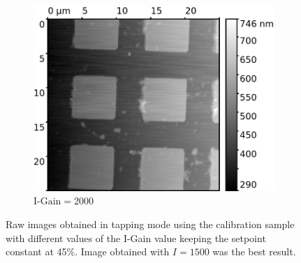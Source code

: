 \documentclass[11pt,a4paper]{article}
\begin{document}
\begin{appendices}
\begin{figure}[H]
\begin{subfigure}[b]{0.48\textwidth}
\includegraphics[width=\textwidth]{tapping_mode_Igain_2000}
\caption{$\text{I-Gain}=2000$}
\end{subfigure}
\caption{Raw images obtained in tapping mode using the calibration sample with different values of the I-Gain value keeping the setpoint constant at 45\%. Image obtained with $I=1500$ was the best result.}
\end{figure}

\end{appendices}
\end{document}
